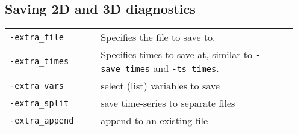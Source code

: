 \documentclass[landscape]{article}
\begin{document}
\begin{textblock}{15}
\section{Saving 2D and 3D diagnostics}
\label{sec:extras}
\begin{tabular}{@{}p{0.3\linewidth}p{0.65\linewidth}@{}}
\texttt{-extra_file} & Specifies the file to save to.\\
\texttt{-extra_times} & Specifies times to save at, similar to
\texttt{-save_times} and \mbox{\texttt{-ts_times}}. \\
\texttt{-extra_vars} & select (list) variables to save\\
\texttt{-extra_split} & save time-series to separate files\\
\texttt{-extra_append} & append to an existing file\\
\end{tabular}

\end{textblock}
\end{document}
